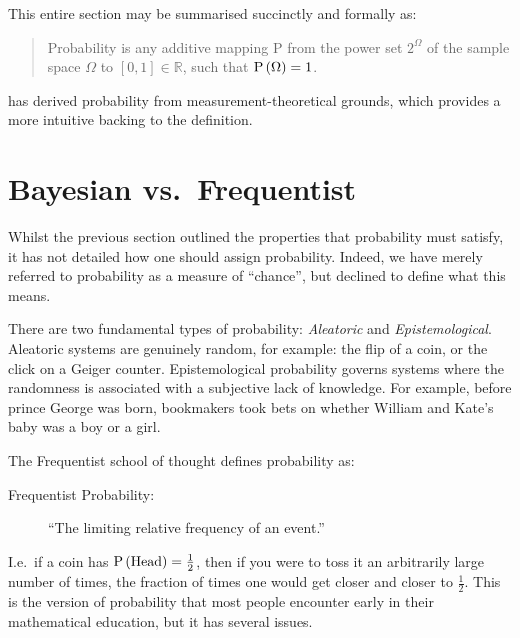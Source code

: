 




This entire section may be summarised succinctly and formally as:
\begin{quote}
  Probability is any additive mapping $\mathrm{P}$ from the power set $2^\Omega$ of the sample space $\Omega$ to $[0,1]\in \mathbb{R}$, such that $\mathrm{P}\left(\Omega\right)=1$.
\end{quote}
\johnskilling{} has derived probability from measurement-theoretical grounds\citep[chap. 1]{Bayesian_methods_in_cosmology}, which provides a more intuitive backing to the definition.



\section{Bayesian vs.\ Frequentist}
\label{sec:bay:bayesian_frequentist}

Whilst the previous section outlined the properties that probability must satisfy, it has not detailed how one should assign probability. Indeed, we have merely referred to probability as a measure of ``chance'', but declined to define what this means.

There are two fundamental types of probability: {\em Aleatoric\/} and {\em Epistemological}. Aleatoric systems are genuinely random, for example: the flip of a coin, or the click on a Geiger counter. Epistemological probability governs systems where the randomness is associated with a subjective lack of knowledge. For example, before prince George was born, bookmakers took bets on whether William and Kate's baby was a boy or a girl. 

The Frequentist school of thought defines probability as:
\begin{description}
  \item[Frequentist Probability:]``The limiting relative frequency of an event.''
\end{description}
I.e.\ if a coin has $\mathrm{P}\left(\mathrm{Head}\right)=\frac{1}{2}$, then if you were to toss it an arbitrarily large number of times, the fraction of times one would get closer and closer to $\frac{1}{2}$. This is the version of probability that most people encounter early in their mathematical education, but it has several issues.

